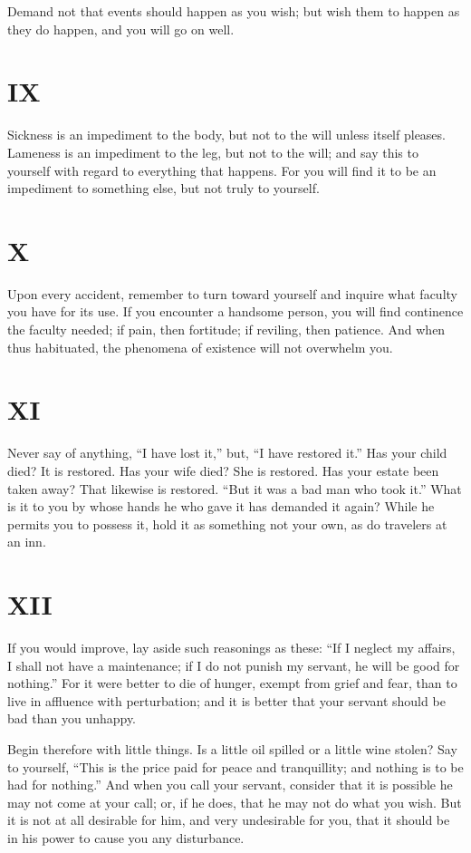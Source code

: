\documentclass[11pt]{article}
\begin{document}
Demand not that events should happen as you wish; but wish them to happen as they do happen, and you will go on well.
\section*{IX}

Sickness is an impediment to the body, but not to the will unless itself pleases. Lameness is an impediment to the leg, but not to the will; and say this to yourself with regard to everything that happens. For you will find it to be an impediment to something else, but not truly to yourself.
\section*{X}

Upon every accident, remember to turn toward yourself and inquire what faculty you have for its use. If you encounter a handsome person, you will find continence the faculty needed; if pain, then fortitude; if reviling, then patience. And when thus habituated, the phenomena of existence will not overwhelm you.
\section*{XI}

Never say of anything, “I have lost it,” but, “I have restored it.” Has your child died? It is restored. Has your wife died? She is restored. Has your estate been taken away? That likewise is restored. “But it was a bad man who took it.” What is it to you by whose hands he who gave it has demanded it again? While he permits you to possess it, hold it as something not your own, as do travelers at an inn.
\section*{XII}

If you would improve, lay aside such reasonings as these: “If I neglect my affairs, I shall not have a maintenance; if I do not punish my servant, he will be good for nothing.” For it were better to die of hunger, exempt from grief and fear, than to live in affluence with perturbation; and it is better that your servant should be bad than you unhappy.

Begin therefore with little things. Is a little oil spilled or a little wine stolen? Say to yourself, “This is the price paid for peace and tranquillity; and nothing is to be had for nothing.” And when you call your servant, consider that it is possible he may not come at your call; or, if he does, that he may not do what you wish. But it is not at all desirable for him, and very undesirable for you, that it should be in his power to cause you any disturbance.
\end{document}
